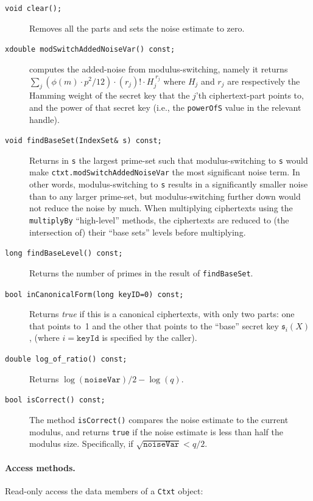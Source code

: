 \documentclass[14pt]{extarticle}
\newcommand{\sk}{\mathfrak{s}}
\begin{document}
\begin{description}
\item[\texttt{void clear();}]
Removes all the parts and sets the noise estimate to zero.

\item[\texttt{xdouble modSwitchAddedNoiseVar() const;}]
computes the added-noise from modulus-switching, namely it
returns $\sum_j (\phi(m)\cdot p^2/12)\cdot(r_j)!\cdot H_j^{\;r_j}$
where $H_j$ and $r_j$ are respectively the Hamming weight of the
secret key that the $j$'th ciphertext-part points to, and the power
of that secret key (i.e., the \texttt{powerOfS} value in the relevant
handle).

\item[\texttt{void findBaseSet(IndexSet\& s) const;}]
Returns in \texttt{s} the largest prime-set such that
modulus-switching to \texttt{s} would make
\texttt{ctxt.modSwitchAddedNoiseVar} the most significant noise
term. In other words, modulus-switching to \texttt{s} results in
a significantly smaller noise than to any larger prime-set, but
modulus-switching further down would not reduce the noise by much.
When multiplying
ciphertexts using the \texttt{multiplyBy} ``high-level'' methods,
the ciphertexts are reduced to (the intersection of) their
``base sets'' levels before multiplying.

\item[\texttt{long findBaseLevel() const;}]
Returns the number of primes in the result of \texttt{findBaseSet}.

\item[\texttt{bool inCanonicalForm(long keyID=0) const;}]
Returns \emph{true} if this is a canonical ciphertexts, with only two
parts: one that points to~1 and the other that points to the ``base''
secret key $\sk_i(X)$, (where $i=\texttt{keyId}$ is specified by the
caller).

\item[\texttt{double log\_of\_ratio() const;}]
Returns $\log(\mathtt{noiseVar})/2 - \log(q)$.

\item[\texttt{bool isCorrect() const;}] 
The method \texttt{isCorrect()} compares the noise estimate to the
current modulus, and returns \texttt{true} if the noise estimate is
less than half the modulus size. Specifically, if
$\sqrt{\mathtt{noiseVar}}<q/2$.
\end{description}

\vspace{-3ex}
\paragraph{Access methods.}
Read-only access the data members of a \texttt{Ctxt} object:
\end{document}
